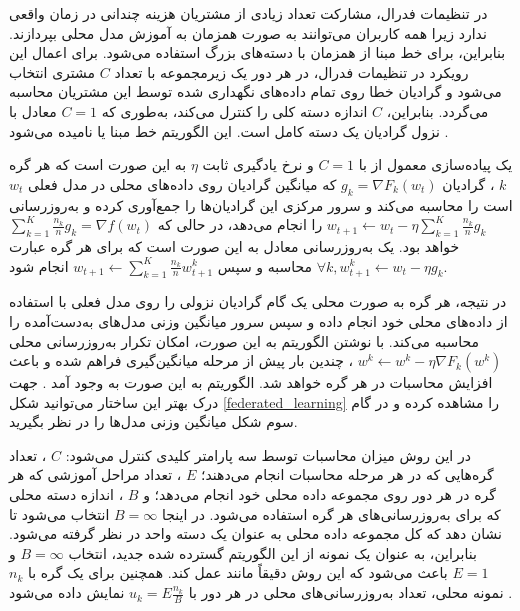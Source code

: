 در تنظیمات فدرال، مشارکت تعداد زیادی از مشتریان هزینه چندانی در زمان واقعی ندارد زیرا همه کاربران می‌توانند به صورت همزمان به آموزش مدل محلی بپردازند. بنابراین، برای خط مبنا از
همزمان با دسته‌های بزرگ استفاده می‌شود. برای اعمال این رویکرد در تنظیمات فدرال، در هر دور یک زیرمجموعه با تعداد
$C$
مشتری انتخاب می‌شود و گرادیان خطا روی تمام داده‌های نگهداری شده توسط این مشتریان محاسبه می‌گردد. بنابراین،
$C$
اندازه دسته کلی را کنترل می‌کند، به‌طوری که
$C = 1$
معادل با نزول گرادیان یک دسته کامل است. این الگوریتم خط مبنا
یا
نامیده می‌شود
\cite{mcmahan2017communication}.


یک پیاده‌سازی معمول از
با
$C = 1$
و نرخ یادگیری ثابت
$\eta$
به این صورت است که هر گره
$k$%
، گرادیان
$g_k=\nabla F_k\left(w_t\right)$
که میانگین گرادیان روی داده‌های محلی در مدل فعلی
$w_t$
است را محاسبه می‌کند و سرور مرکزی این گرادیان‌ها را جمع‌آوری کرده و به‌روزرسانی
$w_{t+1} \leftarrow w_t-\eta \sum_{k=1}^K \frac{n_k}{n} g_k$
را انجام می‌دهد، در حالی که
$\sum_{k=1}^K \frac{n_k}{n} g_k=\nabla f\left(w_t\right)$
خواهد بود. یک به‌روزرسانی معادل به این صورت است که برای هر گره عبارت
$\forall k, w_{t+1}^k \leftarrow w_t-\eta g_k$
محاسبه و سپس
$w_{t+1} \leftarrow \sum_{k=1}^K \frac{n_k}{n} w_{t+1}^k$
انجام شود.

در نتیجه، هر گره به صورت محلی یک گام گرادیان نزولی را روی مدل فعلی با استفاده از داده‌های محلی خود انجام داده و سپس سرور میانگین وزنی مدل‌های به‌دست‌آمده را محاسبه می‌کند. با نوشتن الگوریتم به این صورت، امکان تکرار به‌روزرسانی محلی
$w^k \leftarrow w^k-\eta \nabla F_k\left(w^k\right)$%
، چندین بار پیش از مرحله میانگین‌گیری فراهم شده و باعث افزایش محاسبات در هر گره خواهد شد. الگوریتم
به این صورت به وجود آمد
\cite{mcmahan2017communication}.
جهت درک بهتر این ساختار می‌توانید شکل
\ref{federated_learning}
را مشاهده کرده و در گام سوم شکل میانگین وزنی مدل‌ها را در نظر بگیرید.


در این روش میزان محاسبات توسط سه پارامتر کلیدی کنترل می‌شود:
$C$%
، تعداد گره‌هایی که در هر مرحله محاسبات انجام می‌دهند؛
$E$%
، تعداد مراحل آموزشی که هر گره در هر دور روی مجموعه داده محلی خود انجام می‌دهد؛ و
$B$%
، اندازه دسته محلی که برای به‌روزرسانی‌های هر گره استفاده می‌شود. در اینجا
$B = \infty$
انتخاب می‌شود تا نشان دهد که کل مجموعه داده محلی به عنوان یک دسته واحد در نظر گرفته می‌شود. بنابراین، به عنوان یک نمونه از این الگوریتم گسترده شده جدید، انتخاب
$B = \infty$
و
$E = 1$
باعث می‌شود که این روش دقیقاً مانند
عمل کند. همچنین برای یک گره با
$n_k$
نمونه محلی، تعداد به‌روزرسانی‌های محلی در هر دور با
$u_k=E \frac{n_k}{B}$
نمایش داده می‌شود
\cite{mcmahan2017communication}.



